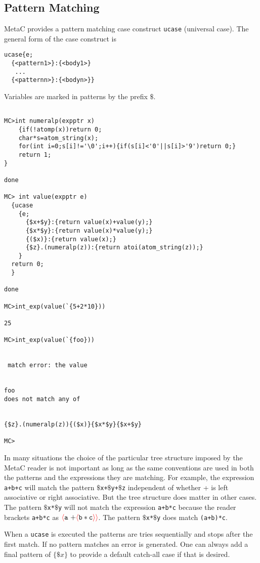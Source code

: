 \documentclass{article}
\newcommand{\fopen}{{\color{red} \langle}}
\newcommand{\fclose}{{\color{red} \rangle}}
\begin{document}
\subsection{Pattern Matching}

MetaC provides a pattern matching case construct {\tt ucase} (universal case).
The general form of the case construct is

\begin{verbatim}
ucase{e;
  {<pattern1>}:{<body1>}
   ...
  {<patternn>}:{<bodyn>}}
\end{verbatim}

Variables are marked in patterns by the prefix $\$$.

\begin{verbatim}

MC>int numeralp(expptr x)
    {if(!atomp(x))return 0;
    char*s=atom_string(x);
    for(int i=0;s[i]!='\0';i++){if(s[i]<'0'||s[i]>'9')return 0;}
    return 1;
}

done

MC> int value(expptr e)
  {ucase
    {e;
      {$x+$y}:{return value(x)+value(y);}
      {$x*$y}:{return value(x)*value(y);}
      {($x)}:{return value(x);}
      {$z}.(numeralp(z)):{return atoi(atom_string(z));}
    }
  return 0;
  }

done

MC>int_exp(value(`{5+2*10}))

25

MC>int_exp(value(`{foo}))


 match error: the value 


foo
does not match any of


{$z}.(numeralp(z)){($x)}{$x*$y}{$x+$y}

MC>
\end{verbatim}

In many situations the choice of the particular tree structure imposed by the MetaC reader is not important as long as the same conventions are used in both the patterns and the expressions
they are matching.  For example, the expression {\tt a+b+c} will match the pattern
{\tt $\$$x+$\$$y+$\$$z} independent of whether + is left associative or right associative.  But the tree structure does matter in other cases.  The pattern {\tt $\$$x*$\$$y}
will not match the expression {\tt a+b*c} because the reader brackets {\tt a+b*c} as  $\fopen \mathtt{a~+} \fopen \mathtt{b * c} \fclose\fclose$. The pattern {\tt $\$$x*$\$$y} does match {\tt (a+b)*c}.

When a {\tt ucase} is executed the patterns are tries sequentially and stops after the first match.  If no pattern matches an error is generated.  One can always add a final pattern of $\{\$x\}$ to provide a default
catch-all case if that is desired.
\end{document}
